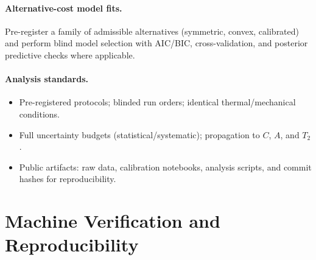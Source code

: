 \documentclass[12pt,a4paper]{article}
\begin{document}
\paragraph{Alternative-cost model fits.}
Pre-register a family of admissible alternatives (symmetric, convex, calibrated) and perform blind model selection with AIC/BIC, cross-validation, and posterior predictive checks where applicable.

\paragraph{Analysis standards.}
\begin{itemize}
  \item Pre-registered protocols; blinded run orders; identical thermal/mechanical conditions.
  \item Full uncertainty budgets (statistical/systematic); propagation to $C$, $A$, and $T_{2}$.
  \item Public artifacts: raw data, calibration notebooks, analysis scripts, and commit hashes for reproducibility.
\end{itemize}

\section{Machine Verification and Reproducibility}
\end{document}
